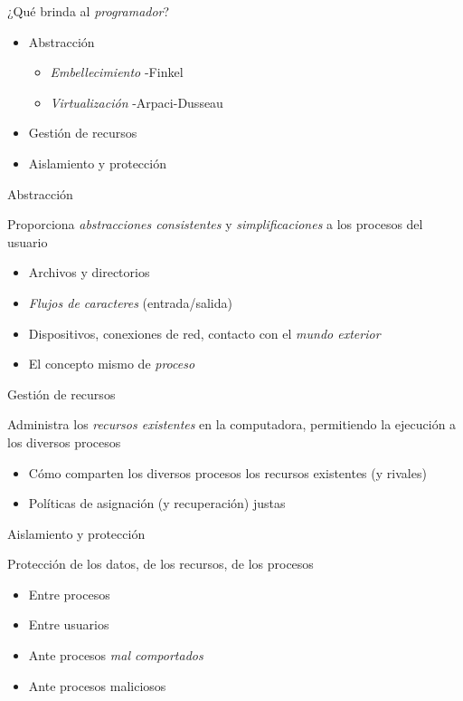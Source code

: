 \documentclass[presentation]{beamer}
\begin{document}
\begin{frame}[label={sec:org0bf9e3e}]{¿Qué brinda al \emph{programador}?}
\begin{itemize}
\item Abstracción
\begin{itemize}
\item \emph{Embellecimiento} -Finkel
\item \emph{Virtualización} -Arpaci-Dusseau
\end{itemize}
\item Gestión de recursos
\item Aislamiento y protección
\end{itemize}
\end{frame}
\begin{frame}[label={sec:org7f21f41}]{Abstracción}
\begin{center}
Proporciona \emph{abstracciones consistentes} y \emph{simplificaciones} a los
procesos del usuario
\end{center}
\begin{itemize}
\item Archivos y directorios
\item \emph{Flujos de caracteres} (entrada/salida)
\item Dispositivos, conexiones de red, contacto con el \emph{mundo exterior}
\item El concepto mismo de \emph{proceso}
\end{itemize}
\end{frame}

\begin{frame}[label={sec:orgdc8b8f5}]{Gestión de recursos}
\begin{center}
Administra los \emph{recursos existentes} en la computadora, permitiendo la
ejecución a los diversos procesos
\end{center}
\begin{itemize}
\item Cómo comparten los diversos procesos los recursos existentes (y
rivales)
\item Políticas de asignación (y recuperación) justas
\end{itemize}
\end{frame}

\begin{frame}[label={sec:orgcc46968}]{Aislamiento y protección}
\begin{center}
Protección de los datos, de los recursos, de los procesos
\end{center}
\begin{itemize}
\item Entre procesos
\item Entre usuarios
\item Ante procesos \emph{mal comportados}
\item Ante procesos maliciosos
\end{itemize}
\end{frame}
\end{document}
